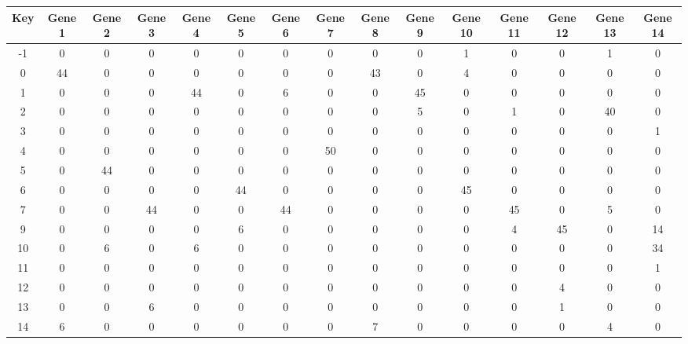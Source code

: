 \begin{tabular}{|c|c|c|c|c|c|c|c|c|c|c|c|c|c|c|}
\hline
Key & Gene 1 & Gene 2 & Gene 3 & Gene 4 & Gene 5 & Gene 6 & Gene 7 & Gene 8 & Gene 9 & Gene 10 & Gene 11 & Gene 12 & Gene 13 & Gene 14 \\
\hline
-1 & 0 & 0 & 0 & 0 & 0 & 0 & 0 & 0 & 0 & 1 & 0 & 0 & 1 & 0 \\
0 & 44 & 0 & 0 & 0 & 0 & 0 & 0 & 43 & 0 & 4 & 0 & 0 & 0 & 0 \\
1 & 0 & 0 & 0 & 44 & 0 & 6 & 0 & 0 & 45 & 0 & 0 & 0 & 0 & 0 \\
2 & 0 & 0 & 0 & 0 & 0 & 0 & 0 & 0 & 5 & 0 & 1 & 0 & 40 & 0 \\
3 & 0 & 0 & 0 & 0 & 0 & 0 & 0 & 0 & 0 & 0 & 0 & 0 & 0 & 1 \\
4 & 0 & 0 & 0 & 0 & 0 & 0 & 50 & 0 & 0 & 0 & 0 & 0 & 0 & 0 \\
5 & 0 & 44 & 0 & 0 & 0 & 0 & 0 & 0 & 0 & 0 & 0 & 0 & 0 & 0 \\
6 & 0 & 0 & 0 & 0 & 44 & 0 & 0 & 0 & 0 & 45 & 0 & 0 & 0 & 0 \\
7 & 0 & 0 & 44 & 0 & 0 & 44 & 0 & 0 & 0 & 0 & 45 & 0 & 5 & 0 \\
9 & 0 & 0 & 0 & 0 & 6 & 0 & 0 & 0 & 0 & 0 & 4 & 45 & 0 & 14 \\
10 & 0 & 6 & 0 & 6 & 0 & 0 & 0 & 0 & 0 & 0 & 0 & 0 & 0 & 34 \\
11 & 0 & 0 & 0 & 0 & 0 & 0 & 0 & 0 & 0 & 0 & 0 & 0 & 0 & 1 \\
12 & 0 & 0 & 0 & 0 & 0 & 0 & 0 & 0 & 0 & 0 & 0 & 4 & 0 & 0 \\
13 & 0 & 0 & 6 & 0 & 0 & 0 & 0 & 0 & 0 & 0 & 0 & 1 & 0 & 0 \\
14 & 6 & 0 & 0 & 0 & 0 & 0 & 0 & 7 & 0 & 0 & 0 & 0 & 4 & 0 \\
\hline
\end{tabular}